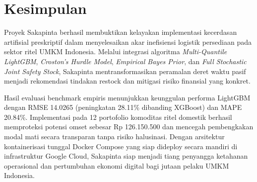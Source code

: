 \documentclass[12pt,a4paper]{article}
\begin{document}
\section{Kesimpulan}
Proyek Sakapinta berhasil membuktikan kelayakan implementasi kecerdasan artifisial preskriptif dalam menyelesaikan akar inefisiensi logistik persediaan pada sektor ritel UMKM Indonesia. Melalui integrasi algoritma \textit{Multi-Quantile LightGBM}, \textit{Croston's Hurdle Model}, \textit{Empirical Bayes Prior}, dan \textit{Full Stochastic Joint Safety Stock}, Sakapinta mentransformasikan peramalan deret waktu pasif menjadi rekomendasi tindakan restock dan mitigasi risiko finansial yang konkret. 

Hasil evaluasi benchmark empiris menunjukkan keunggulan performa LightGBM dengan RMSE 14.0265 (peningkatan 28.11\% dibanding XGBoost) dan MAPE 20.84\%. Implementasi pada 12 portofolio komoditas ritel domestik berhasil memproteksi potensi omset sebesar Rp 126.150.500 dan mencegah pembengkakan modal mati secara transparan tanpa risiko halusinasi. Dengan arsitektur kontainerisasi tunggal Docker Compose yang siap dideploy secara mandiri di infrastruktur Google Cloud, Sakapinta siap menjadi tiang penyangga ketahanan operasional dan pertumbuhan ekonomi digital bagi jutaan pelaku UMKM Indonesia.

\newpage


\end{document}
